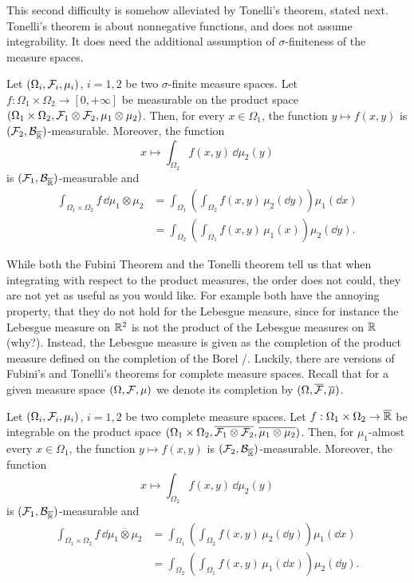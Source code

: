 This second difficulty is somehow alleviated by Tonelli's theorem, stated next. Tonelli's theorem is about nonnegative functions, and does not assume integrability. It does need the additional assumption of $\sigma$-finiteness of the measure spaces.

\begin{theorem}
	Let $(\Omega_i, \mathcal F_i, \mu_i)$, $i=1,2$ be two $\sigma$-finite measure spaces. 
	Let $f : \Omega_1 \times \Omega_2 \to [0,+\infty]$ be measurable on the product space $(\Omega_1 \times \Omega_2, \mathcal F_1 \otimes \mathcal F_2, \mu_1 \otimes \mu_2)$. Then, for every $x \in \Omega_1$, the function $y \mapsto f(x, y)$ is $(\mathcal F_2,\mathcal B_{\overline{\mathbb R}})$-measurable. Moreover, the function 
	\[
	x \mapsto \int_{\Omega_2} f(x,y)\, \dd \mu_2(y)
	\]
	is $(\mathcal F_1,\mathcal B_{\overline{\mathbb R}})$-measurable and
	\[
	\begin{split}
	\int_{\Omega_1 \times \Omega_2} f\, \dd \mu_1 \otimes \mu_2 
	&= \int_{\Omega_1} \left( \int_{\Omega_2 } f(x,  y ) \,\mu_2(\dd y) \right) \mu_1(\dd x)\\
	&= \int_{\Omega_2} \left( \int_{\Omega_1} f(x, y)  \,\mu_1(x) \right) \mu_2(\dd y).
	\end{split}
	\] 
\end{theorem}

While both the Fubini Theorem and the Tonelli theorem tell us that when integrating with respect to the product measures, the order does not could, they are not yet as useful as you would like. For example both have the annoying property, that they do not hold for the Lebesgue measure, since for instance the Lebesgue measure on $\mathbb R^2$ is not the product of the Lebesgue measures on $\mathbb R$ (why?). Instead, the Lebesgue measure is given as the completion of the product measure defined on the completion of the Borel \sigalg/. Luckily, there are versions of Fubini's and Tonelli's theorems for complete measure spaces. Recall that for a given measure space $(\Omega, \mathcal F, \mu)$ we denote its completion by $(\Omega, \overline{\mathcal F}, \overline{\mu})$.

\begin{theorem}
Let $(\Omega_i, \mathcal F_i, \mu_i)$, $i=1,2$ be two complete measure spaces. 
Let $f : \Omega_1 \times \Omega_2 \to \overline{\mathbb R}$ be integrable on the product space $(\Omega_1 \times \Omega_2, \overline{\mathcal F_1 \otimes \mathcal F_2}, \overline{\mu_1 \otimes \mu_2})$. Then, for $\mu_1$-almost every $x \in \Omega_1$, the function $y \mapsto f(x, y)$ is $(\mathcal F_2,\mathcal B_{\overline{\mathbb R}})$-measurable. Moreover, the function 
\[
x \mapsto \int_{\Omega_2} f(x,y)\, \dd \mu_2(y)
\]
is $(\mathcal F_1,\mathcal B_{\overline{\mathbb R}})$-measurable and
\[
\begin{split}
\int_{\Omega_1 \times \Omega_2} f\, \dd \overline{\mu_1 \otimes \mu_2} 
&= \int_{\Omega_1} \left( \int_{\Omega_2 } f(x,  y ) \,\mu_2(\dd y) \right) \mu_1(\dd x)\\
&= \int_{\Omega_2} \left( \int_{\Omega_1} f(x, y) \,\mu_1(\dd x) \right) \mu_2(\dd y).
\end{split}
\] 	
\end{theorem}

